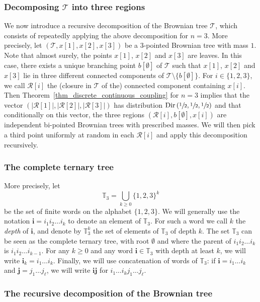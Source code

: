 \documentclass[11pt]{article}
\let\backslash\setminus
\newcommand{\Tt}{\mathcal{T}}
\newcommand{\Rr}{\mathcal{R}}
\newcommand{\ii}{\mathbf{i}}
\newcommand{\jj}{\mathbf{j}}
\newcommand{\Dir}{\mathrm{Dir}}
\theoremstyle{plain}
\theoremstyle{definition}
\numberwithin{equation}{section}
\begin{document}
\subsubsection*{Decomposing $\Tt$ into three regions}
We now introduce a recursive decomposition of the Brownian tree $\Tt$, which consists of repeatedly applying the above decomposition for $n=3$.
More precisely, let $\left( \Tt, x[1], x[2], x[3] \right)$ be a $3$-pointed Brownian tree with mass $1$.
Note that almost surely, the points $x[1]$, $x[2]$ and $x[3]$ are leaves.
In this case, there exists a unique branching point $b[\emptyset]$ of $\Tt$ such that $x[1]$, $x[2]$ and $x[3]$ lie in three different connected components of $\Tt \backslash \{b[\emptyset]\}$.
For $i \in \{1,2,3\}$, we call $\Rr[i]$ the (closure in $\Tt$ of the) connected component containing $x[i]$.
Then Theorem~\ref{thm_discrete_continuous_coupling} for $n=3$ implies that the vector $\left( \left| \Rr[1] \right|, \left| \Rr[2] \right|, \left| \Rr[3] \right| \right)$ has distribution $\Dir \left( \sfrac{1}{2}, \sfrac{1}{2}, \sfrac{1}{2} \right)$ and that conditionally on this vector, the three regions $\left( \Rr[i], b[\emptyset], x[i] \right)$ are independent bi-pointed Brownian trees with prescribed masses.
We will then pick a third point uniformly at random in each $\Rr[i]$ and apply this decomposition recursively.

\subsubsection*{The complete ternary tree}
More precisely, let\vspace*{-3pt}\enlargethispage{.5\baselineskip}
\[ \mathbb{T}_3=\bigcup_{k \geq 0} \{1,2,3\}^k\]
be the set of finite words on the alphabet $\{1,2,3\}$.
We will generally use the notation $\ii=i_1 i_2 \dots i_k$ to denote an element of $\mathbb{T}_3$.
For such a word we call $k$ the \emph{depth} of $\ii$, and denote by $\mathbb{T}_3^k$ the set of elements of $ \mathbb{T}_3$ of depth $k$.
The set $\mathbb{T}_3$ can be seen as the complete ternary tree, with root $\emptyset$ and where the parent of $i_1 i_2 \dots i_k$ is $i_1 i_2 \dots i_{k-1}$.
For any $k \geq 0$ and any word $\ii \in \mathbb{T}_3$ with depth at least $k$, we will write $\ii_k=i_1 \dots i_k$.
Finally, we will use concatenation of words of $\mathbb{T}_3$: if $\ii=i_1 \dots i_k$ and $\jj=j_1 \dots j_{\ell}$, we will write $\ii\jj$ for $i_1 \dots i_k j_1 \dots j_{\ell}$.

\subsubsection*{The recursive decomposition of the Brownian tree}
\end{document}
